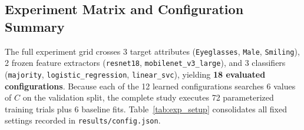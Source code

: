 \documentclass[12pt,a4paper]{article}
\newcommand{\code}[1]{\texttt{#1}}
\begin{document}
\subsection{Experiment Matrix and Configuration Summary}
\label{subsec:exp_matrix}

The full experiment grid crosses 3 target attributes (\code{Eyeglasses}, \code{Male}, \code{Smiling}), 2 frozen feature extractors (\code{resnet18}, \code{mobilenet\_\allowbreak{}v3\_\allowbreak{}large}), and 3 classifiers (\code{majority}, \code{logistic\_\allowbreak{}regression}, \code{linear\_\allowbreak{}svc}), yielding \textbf{18 evaluated configurations}. Because each of the 12 learned configurations searches 6 values of $C$ on the validation split, the complete study executes 72 parameterized training trials plus 6 baseline fits. Table~\ref{tab:exp_setup} consolidates all fixed settings recorded in \code{results/\allowbreak{}config.json}.
\end{document}

